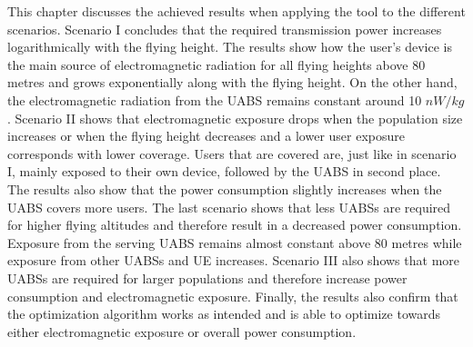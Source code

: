 This chapter discusses the achieved results when applying the tool to the different scenarios.
Scenario I concludes that the required transmission power increases logarithmically with the flying height.
The results show how the user's device is the main source of electromagnetic radiation 
for all flying heights above 80 metres and grows exponentially along with the flying height. 
On the other hand, the electromagnetic 
radiation from the \gls{UABS} remains constant around 10 $nW/kg$.
Scenario II shows that electromagnetic exposure  drops when the population size increases or when the flying height decreases
and a lower user exposure corresponds with lower coverage. Users that are covered are, just like in scenario I, 
mainly exposed to their own device, followed by the \gls{UABS} in second place. The results also show that 
the power consumption slightly increases when the \gls{UABS} covers more users.
The last scenario shows that less \gls{UABS}s are required for higher flying altitudes and therefore 
result in a decreased power consumption.  Exposure from the serving \gls{UABS} remains almost constant above 80 metres while 
exposure from other \gls{UABS}s and \gls{UE} increases. Scenario III also shows that more \gls{UABS}s are 
required for larger populations and therefore increase power consumption and electromagnetic exposure.
Finally, the results also confirm that the optimization algorithm works as intended 
and is able to optimize towards either electromagnetic exposure or overall power consumption.